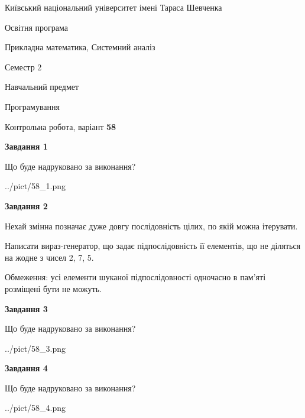 \documentclass[12pt, ukrainian]{article}
\begin{document}
{{\begin {small}\par
{ \center  Київський національний університет імені Тараса Шевченка \par}
{\parbox {5 cm}{Освітня програма \hfill}{\parbox {8 cm}{Прикладна математика, Системний аналіз \hfill}}\parbox {5 cm}{\hfill Семестр 2}}\par
{\parbox {5 cm} {Навчальний предмет \hfill}\parbox {7 cm}{Програмування \hfill}\parbox {6cm}{\hfill}\par}\vspace{-7pt} \end{small}}{\center Контрольна робота, варіант  \No \textbf
{ 58 }\par}}
{
\begin {large}
{\begin {center}\textbf{Завдання 1}\end {center}}\par
Що буде надруковано за виконання?\par\par
\begin{center}
	{../pict/58_1.png}
\end{center}
\newpage

{\begin {center}\textbf{Завдання 2}\end {center}}\par
Нехай змінна  позначає дуже довгу послідовність цілих, по якій можна ітерувати.

Написати вираз-генератор, що задає підпослідовність її елементів, що не діляться на жодне з чисел 2, 7, 5.

Обмеження: усі елементи шуканої підпослідовності одночасно в пам'яті розміщені бути не можуть.\par
\newpage

{\begin {center}\textbf{Завдання 3}\end {center}}\par
Що буде надруковано за виконання?
\begin{center}
	{../pict/58_3.png}
\end{center}
\newpage

{\begin {center}\textbf{Завдання 4}\end {center}}\par
Що буде надруковано за виконання?\par
\begin{center}
	{../pict/58_4.png}
\end{center}
\newpage


\end{large}}
\end{document}
